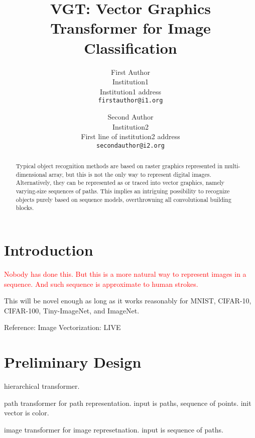 \documentclass[10pt,twocolumn,letterpaper]{article}
\begin{document}
\title{VGT: Vector Graphics Transformer for Image Classification}

\author{First Author\\
Institution1\\
Institution1 address\\
{\tt\small firstauthor@i1.org}
\and
Second Author\\
Institution2\\
First line of institution2 address\\
{\tt\small secondauthor@i2.org}
}
\maketitle

\begin{abstract}
    Typical object recognition methods are based on raster graphics represented
    in multi-dimensional array, but this is not the only way to represent
    digital images.
    Alternatively, they can be represented as or traced into vector graphics,
    namely varying-size sequences of paths.
    This implies an intriguing possibility to recognize objects purely based on
    sequence models, overthrowning all convolutional building blocks.
\end{abstract}

\section{Introduction}
\label{sec:intro}

\textcolor{red}{Nobody has done this. But this is a more natural way to represent images in a sequence. 
And such sequence is approximate to human strokes.}

This will be novel enough as long as it works reasonably for MNIST, CIFAR-10,
CIFAR-100, Tiny-ImageNet, and ImageNet.

Reference: Image Vectorization: LIVE \cite{live}

\section{Preliminary Design}

hierarchical transformer.

path transformer for path representation. input is paths, sequence of points. init vector is color.

image transformer for image represetnation. input is sequence of paths.


{\small


}
\end{document}
